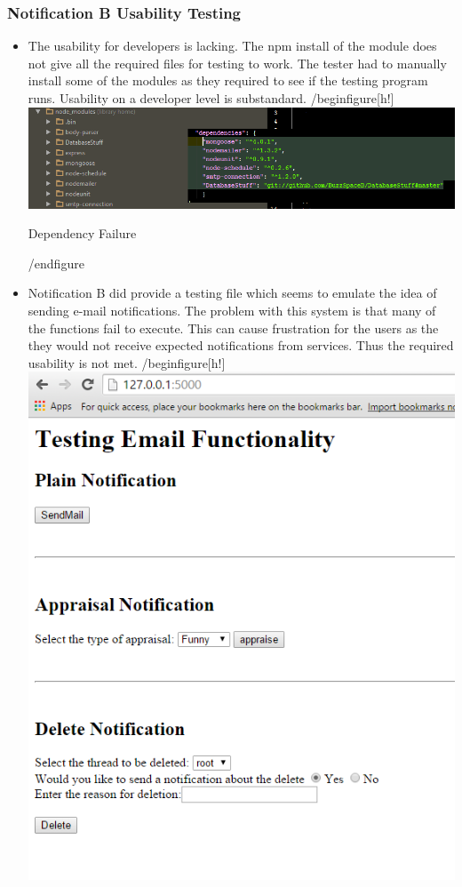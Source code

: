 \subsubsection{Notification B Usability Testing}
\begin{itemize}
	\item The usability for developers is lacking. The npm install of the module does not give all the required files for testing to work. The tester had to manually install some of the modules as they required to see if the testing program runs. Usability on a developer level is substandard. 
	/begin{figure}[h!]
		\includegraphics[width=\linewidth]{../images/Dependencies.png}
		\caption{Dependency Failure}
		\label{fig:depFailA}
	/end{figure}
	\item Notification B did provide a testing file which seems to emulate the idea of sending e-mail notifications. The problem with this system is that many of the functions fail to execute. This can cause frustration for the users as the they would not receive expected notifications from services. Thus the required usability is not met.
	/begin{figure}[h!]
		\includegraphics[width=\linewidth]{../images/Interface.png}

\end{itemize}
